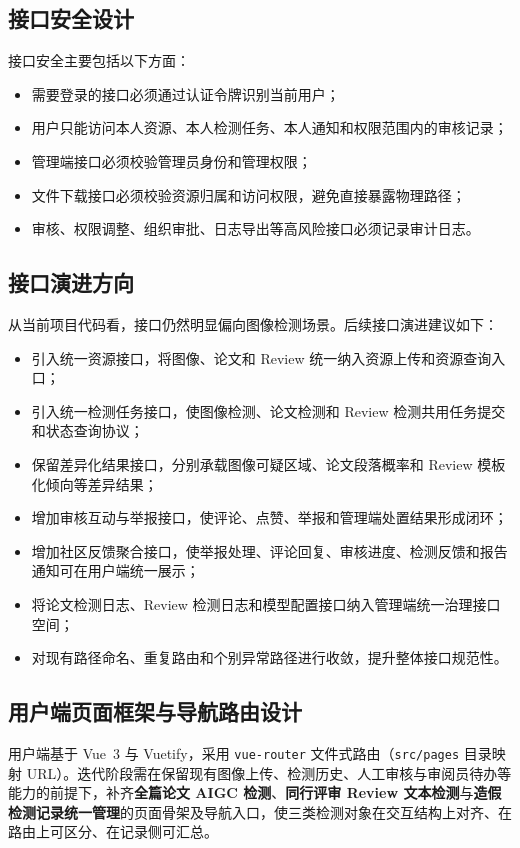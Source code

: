 \subsection{接口安全设计}
接口安全主要包括以下方面：
\begin{itemize}[leftmargin=2em]
    \item 需要登录的接口必须通过认证令牌识别当前用户；
    \item 用户只能访问本人资源、本人检测任务、本人通知和权限范围内的审核记录；
    \item 管理端接口必须校验管理员身份和管理权限；
    \item 文件下载接口必须校验资源归属和访问权限，避免直接暴露物理路径；
    \item 审核、权限调整、组织审批、日志导出等高风险接口必须记录审计日志。
\end{itemize}

\subsection{接口演进方向}
从当前项目代码看，接口仍然明显偏向图像检测场景。后续接口演进建议如下：
\begin{itemize}[leftmargin=2em]
    \item 引入统一资源接口，将图像、论文和 Review 统一纳入资源上传和资源查询入口；
    \item 引入统一检测任务接口，使图像检测、论文检测和 Review 检测共用任务提交和状态查询协议；
    \item 保留差异化结果接口，分别承载图像可疑区域、论文段落概率和 Review 模板化倾向等差异结果；
    \item 增加审核互动与举报接口，使评论、点赞、举报和管理端处置结果形成闭环；
    \item 增加社区反馈聚合接口，使举报处理、评论回复、审核进度、检测反馈和报告通知可在用户端统一展示；
    \item 将论文检测日志、Review 检测日志和模型配置接口纳入管理端统一治理接口空间；
    \item 对现有路径命名、重复路由和个别异常路径进行收敛，提升整体接口规范性。
\end{itemize}

\subsection{用户端页面框架与导航路由设计}\label{sec:user-client-routing}
用户端基于 Vue~3 与 Vuetify，采用 \texttt{vue-router} 文件式路由（\texttt{src/pages} 目录映射 URL）。迭代阶段需在保留现有图像上传、检测历史、人工审核与审阅员待办等能力的前提下，补齐\textbf{全篇论文 AIGC 检测}、\textbf{同行评审 Review 文本检测}与\textbf{造假检测记录统一管理}的页面骨架及导航入口，使三类检测对象在交互结构上对齐、在路由上可区分、在记录侧可汇总。

